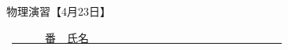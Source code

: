 \documentclass[a4paper,9pt]{jsarticle}
\begin{document}
\hakosyokika
\begin{center}
{\Large 物理演習【4月23日】}
\end{center}
\hfill ~\underline{~~~~~~番　氏名~~~~~~~~~~~~~~~~~~~~~~~~~~~~~~~~~~~}
\hakosyokika

\begin{enumerate}
    
\newpage
    
\newpage
    
\newpage
    
\newpage
    
% 
\vfill
\end{enumerate}
\end{document}
